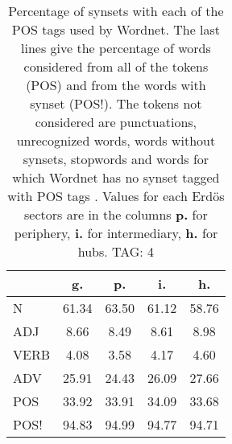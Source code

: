 \begin{table}[h!]
\begin{center}
\begin{tabular}{| l || c | c | c | c |}\hline
 & {\bf g.} & {\bf p.} & {\bf i.} & {\bf h.} \\\hline\hline
N & 61.34  & 63.50  & 61.12  & 58.76 \\\hline
ADJ & 8.66  & 8.49  & 8.61  & 8.98 \\\hline
VERB & 4.08  & 3.58  & 4.17  & 4.60 \\\hline
ADV & 25.91  & 24.43  & 26.09  & 27.66 \\\hline\hline
POS & 33.92  & 33.91  & 34.09  & 33.68 \\\hline
POS! & 94.83  & 94.99  & 94.77  & 94.71 \\\hline
\end{tabular}
\caption{Percentage of synsets with each of the POS tags used by Wordnet. The last lines give the percentage of words considered from all of the tokens (POS) and from the words with synset (POS!). The tokens not considered are punctuations, unrecognized words, words without synsets, stopwords and words for which Wordnet has no synset  tagged with POS tags . Values for each Erd\"os sectors are in the columns {{\bf p.}} for periphery, {{\bf i.}} for intermediary, {{\bf h.}} for hubs. TAG: 4}
\end{center}
\end{table}